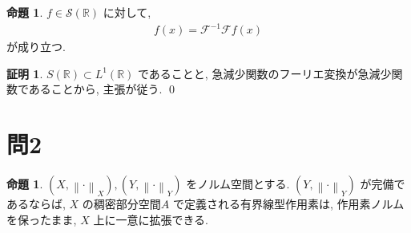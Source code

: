 \documentclass[10pt, fleqn, label-section=none]{bxjsarticle}
\theoremstyle{definition}
\newtheorem{prop}[dfn]{命題}
\newtheorem*{pf*}{証明}
\newcommand{\norm}[1]{\left\|#1\right\|}
\renewcommand{\;}{\, ; \,}
\begin{document}
\begin{prop}$f \in \mathcal S (\mathbb R)$ に対して, 
\begin{align*} f(x) = \mathcal F^{-1} \mathcal F f(x) \end{align*}
が成り立つ. 
\end{prop}
\begin{pf*}
$ S (\mathbb R) \subset L^1 (\mathbb R)$ であることと, 急減少関数のフーリエ変換が急減少関数であることから, 主張が従う. 
\qed
\end{pf*}

\section{問2}
\begin{prop}$(X, \norm{\cdot}_{X}), (Y, \norm{\cdot}_Y)$ をノルム空間とする. $(Y, \norm{\cdot}_Y)$ が完備であるならば, $X$ の稠密部分空間$A$ で定義される有界線型作用素は, 作用素ノルムを保ったまま, $X$ 上に一意に拡張できる. 

\end{prop}
\end{document}
